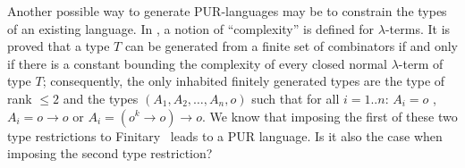 Another possible way to generate PUR-languages may be to constrain
the types of an existing language. In \cite{DBLP:conf/tlca/Joly01},
a notion of ``complexity'' is defined for $\lambda$-terms. It is
proved that a type $T$ can be generated from a finite set of
combinators if and only if there is a constant bounding the
complexity of every closed normal $\lambda$-term of type $T$;
consequently, the only inhabited finitely generated types are the
type of rank $\leq 2$ and the types $(A_1, A_2, \ldots, A_n, o)$
such that for all $i = 1..n$: $A_i = o$ , $A_i = o \rightarrow o$ or
$A_i = (o^k \rightarrow o) \rightarrow o$. We know that imposing the
first of these two type restrictions to Finitary \ialgol\ leads to a
PUR language. Is it also the case when imposing the second type
restriction?



    
    

         {\protect{}}


\bigsqcup%
